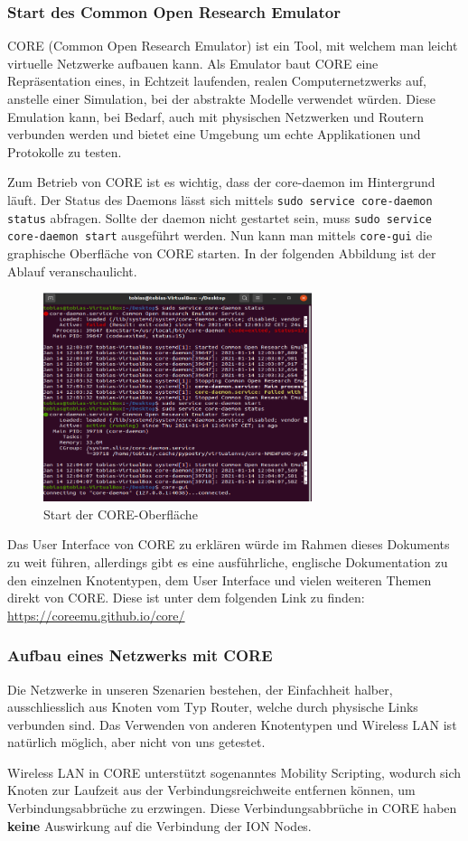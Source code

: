 \documentclass{article}
\begin{document}
{\subsubsection{Start des Common Open Research Emulator}
CORE (Common Open Research Emulator) ist ein Tool, mit welchem man leicht virtuelle Netzwerke aufbauen kann. Als Emulator baut CORE eine Repräsentation eines, in Echtzeit laufenden, realen Computernetzwerks auf, anstelle einer Simulation, bei der abstrakte Modelle verwendet würden. Diese Emulation kann, bei Bedarf, auch mit physischen Netzwerken und Routern verbunden werden und bietet eine Umgebung um echte Applikationen und Protokolle zu testen. \cite{core-docs}\par
Zum Betrieb von CORE ist es wichtig, dass der core-daemon im Hintergrund läuft. Der Status des Daemons lässt sich mittels \texttt{sudo service core-daemon status} abfragen. Sollte der daemon nicht gestartet sein, muss \texttt{sudo service core-daemon start} ausgeführt werden. Nun kann man mittels \texttt{core-gui} die graphische Oberfläche von CORE starten. In der folgenden Abbildung ist der Ablauf veranschaulicht.\par
\begin{figure}[ht]
\centering
\includegraphics[width=0.7\textwidth]{core-start}
\caption{Start der CORE-Oberfläche}
\end{figure}
Das User Interface von CORE zu erklären würde im Rahmen dieses Dokuments zu weit führen, allerdings gibt es eine ausführliche, englische Dokumentation zu den einzelnen Knotentypen, dem User Interface und vielen weiteren Themen direkt von CORE. Diese ist unter dem folgenden Link zu finden: \url{https://coreemu.github.io/core/}\par
\subsubsection{Aufbau eines Netzwerks mit CORE}
Die Netzwerke in unseren Szenarien bestehen, der Einfachheit halber, ausschliesslich aus Knoten vom Typ Router, welche durch physische Links verbunden sind. Das Verwenden von anderen Knotentypen und Wireless LAN ist natürlich möglich, aber nicht von uns getestet.\par
Wireless LAN in CORE unterstützt sogenanntes Mobility Scripting, wodurch sich Knoten zur Laufzeit aus der Verbindungsreichweite entfernen können, um Verbindungsabbrüche zu erzwingen. Diese Verbindungsabbrüche in CORE haben \textbf{keine} Auswirkung auf die Verbindung der ION Nodes.
}
\end{document}
